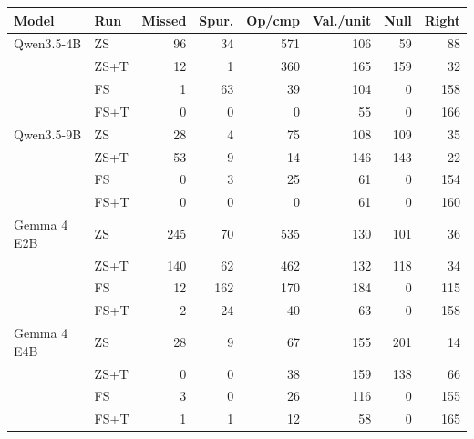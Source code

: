 \begin{tabular}{llrrrrrr}
\toprule
Model & Run & Missed & Spur. & Op/cmp & Val./unit & Null & Right \\
\midrule
Qwen3.5-4B & ZS & 96 & 34 & 571 & 106 & 59 & 88 \\
 & ZS+T & 12 & 1 & 360 & 165 & 159 & 32 \\
 & FS & 1 & 63 & 39 & 104 & 0 & 158 \\
 & FS+T & 0 & 0 & 0 & 55 & 0 & 166 \\
\midrule
Qwen3.5-9B & ZS & 28 & 4 & 75 & 108 & 109 & 35 \\
 & ZS+T & 53 & 9 & 14 & 146 & 143 & 22 \\
 & FS & 0 & 3 & 25 & 61 & 0 & 154 \\
 & FS+T & 0 & 0 & 0 & 61 & 0 & 160 \\
\midrule
Gemma 4 E2B & ZS & 245 & 70 & 535 & 130 & 101 & 36 \\
 & ZS+T & 140 & 62 & 462 & 132 & 118 & 34 \\
 & FS & 12 & 162 & 170 & 184 & 0 & 115 \\
 & FS+T & 2 & 24 & 40 & 63 & 0 & 158 \\
\midrule
Gemma 4 E4B & ZS & 28 & 9 & 67 & 155 & 201 & 14 \\
 & ZS+T & 0 & 0 & 38 & 159 & 138 & 66 \\
 & FS & 3 & 0 & 26 & 116 & 0 & 155 \\
 & FS+T & 1 & 1 & 12 & 58 & 0 & 165 \\
\bottomrule
\end{tabular}
